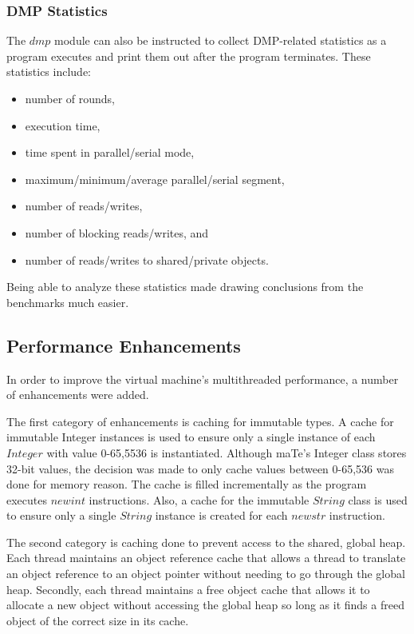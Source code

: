 \subsubsection{DMP Statistics}

The $dmp$ module can also be instructed to collect DMP-related
statistics as a program executes and print them out after the program
terminates.  These statistics include:

\begin{itemize}
\item number of rounds,
\item execution time,
\item time spent in parallel/serial mode,
\item maximum/minimum/average parallel/serial segment,
\item number of reads/writes,
\item number of blocking reads/writes, and
\item number of reads/writes to shared/private objects.
\end{itemize}

Being able to analyze these statistics made drawing conclusions from
the benchmarks much easier.

\subsection{Performance Enhancements}

In order to improve the virtual machine's multithreaded performance, a
number of enhancements were added.

The first category of enhancements is caching for immutable types.  A
cache for immutable Integer instances is used to ensure only a single
instance of each $Integer$ with value 0-65,5536 is instantiated.
Although maTe's Integer class stores 32-bit values, the decision was
made to only cache values between 0-65,536 was done for memory reason.
The cache is filled incrementally as the program executes $newint$
instructions.  Also, a cache for the immutable $String$ class is used
to ensure only a single $String$ instance is created for each $newstr$
instruction.

The second category is caching done to prevent access to the shared,
global heap.  Each thread maintains an object reference cache that
allows a thread to translate an object reference to an object pointer
without needing to go through the global heap.  Secondly, each thread
maintains a free object cache that allows it to allocate a new object
without accessing the global heap so long as it finds a freed object
of the correct size in its cache.


